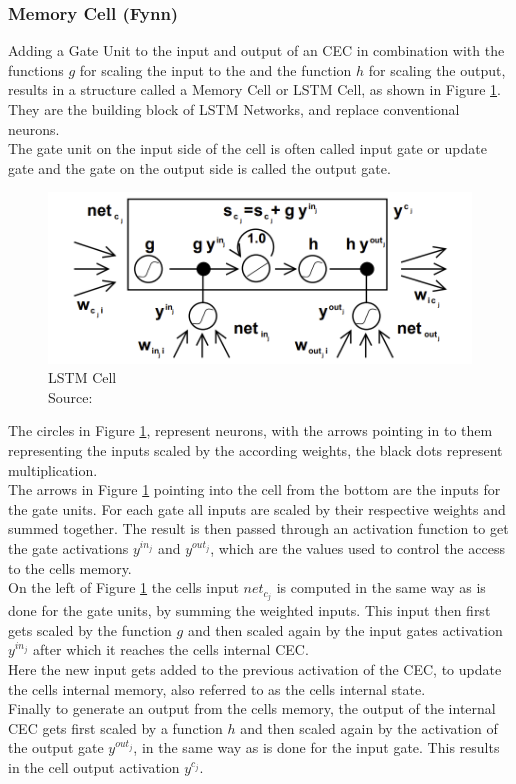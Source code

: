 \documentclass[twoside,a4paper,10pt,DIV=12,BCOR=12mm]{scrartcl}
\begin{document}
\subsubsection{Memory Cell (Fynn)}
Adding a Gate Unit to the input and output of an CEC in combination with the functions $g$ for scaling the input to the and the function $h$ for scaling the output, results in a structure called a Memory Cell or LSTM Cell, as shown in Figure \ref{fig:lstm-cell}. They are the building block of LSTM Networks, and replace conventional neurons.\cite{hochreiter1997lstm} \\
The gate unit on the input side of the cell is often called input gate or update gate and the gate on the output side is called the output gate.\cite{hochreiter1997lstm} \\
\begin{figure}[h!]
    \centering
    \includegraphics[width=\linewidth]{LSTM-Cell-Diagram.png}
    \caption{LSTM Cell\\ Source: \cite{hochreiter1997lstm}}
    \label{fig:lstm-cell}
\end{figure}
The circles in Figure \ref{fig:lstm-cell}, represent neurons, with the arrows pointing in to them representing the inputs scaled by the according weights, the black dots represent multiplication.\cite{hochreiter1997lstm} \\
The arrows in Figure \ref{fig:lstm-cell} pointing into the cell from the bottom are the inputs for the gate units. For each gate all inputs are scaled by their respective weights and summed together. The result is then passed through an activation function to get the gate activations $y^{in_j}$ and $y^{out_j}$, which are the values used to control the access to the cells memory.\cite{hochreiter1997lstm} \\
On the left of Figure \ref{fig:lstm-cell} the cells input $net_{c_j}$ is computed in the same way as is done for the gate units, by summing the weighted inputs. This input then first gets scaled by the function $g$ and then scaled again by the input gates activation $y^{in_j}$ after which it reaches the cells internal CEC. \cite{hochreiter1997lstm} \\
Here the new input gets added to the previous activation of the CEC, to update the cells internal memory, also referred to as the cells internal state.\cite{hochreiter1997lstm} \\
Finally to generate an output from the cells memory, the output of the internal CEC gets first scaled by a function $h$ and then scaled again by the activation of the output gate $y^{out_j}$, in the same way as is done for the input gate. This results in the cell output activation $y^{c_j}$.\cite{hochreiter1997lstm} 
\end{document}
